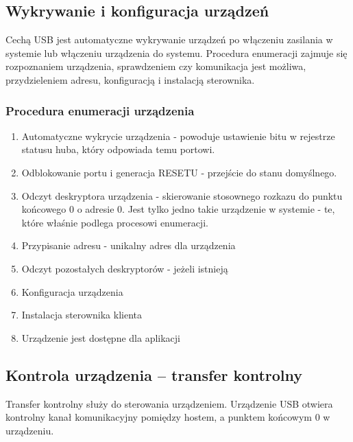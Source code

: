 \subsection{Wykrywanie i konfiguracja urządzeń}
	Cechą USB jest automatyczne wykrywanie urządzeń po włączeniu zasilania w systemie lub włączeniu urządzenia do systemu. Procedura enumeracji zajmuje się rozpoznaniem urządzenia, sprawdzeniem czy komunikacja jest możliwa, przydzieleniem adresu, konfiguracją i instalacją sterownika.
	\subsubsection{Procedura enumeracji urządzenia}
	\begin{enumerate}
		\item Automatyczne wykrycie urządzenia - powoduje ustawienie bitu w rejestrze statusu huba, który odpowiada temu portowi.
		\item Odblokowanie portu i generacja RESETU - przejście do stanu domyślnego.
		\item Odczyt deskryptora urządzenia - skierowanie stosownego rozkazu do punktu końcowego 0 o adresie 0. Jest tylko jedno takie urządzenie w systemie - te, które właśnie podlega procesowi enumeracji.
		\item Przypisanie adresu - unikalny adres dla urządzenia
		\item Odczyt pozostałych deskryptorów - jeżeli istnieją
		\item Konfiguracja urządzenia
		\item Instalacja sterownika klienta
		\item Urządzenie jest dostępne dla aplikacji
	\end{enumerate}
	
\subsection{Kontrola urządzenia – transfer kontrolny}
	Transfer kontrolny służy do sterowania urządzeniem. Urządzenie USB otwiera kontrolny kanał komunikacyjny pomiędzy hostem, a punktem końcowym 0 w urządzeniu.
